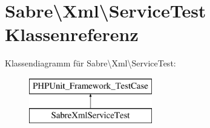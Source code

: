 \hypertarget{class_sabre_1_1_xml_1_1_service_test}{}\section{Sabre\textbackslash{}Xml\textbackslash{}Service\+Test Klassenreferenz}
\label{class_sabre_1_1_xml_1_1_service_test}
Klassendiagramm für Sabre\textbackslash{}Xml\textbackslash{}Service\+Test\+:\begin{figure}[H]
\begin{center}
\leavevmode
\includegraphics[height=2.000000cm]{class_sabre_1_1_xml_1_1_service_test}
\end{center}
\end{figure}
